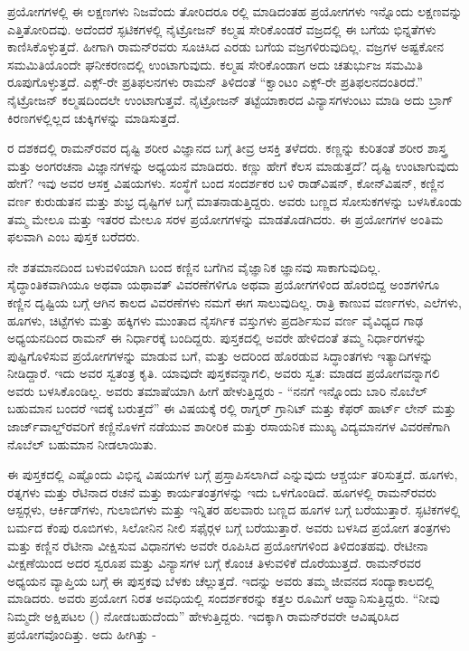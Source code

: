 ಪ್ರಯೋಗಗಳಲ್ಲಿ ಈ ಲಕ್ಷಣಗಳು ನಿಜವೆಂದು ತೋರಿದರೂ ರಲ್ಲಿ ಮಾಡಿದಂತಹ ಪ್ರಯೋಗಗಳು ಇನ್ನೊಂದು ಲಕ್ಷಣವನ್ನು ಎತ್ತಿತೋರಿದವು. ಅದೆಂದರೆ ಸ್ಫಟಿಕಗಳಲ್ಲಿ ನೈಟ್ರೋಜನ್ ಕಲ್ಮಷ ಸೇರಿಕೊಂಡರೆ ವಜ್ರದಲ್ಲಿ ಈ ಬಗೆಯ ಭಿನ್ನತೆಗಳು ಕಾಣಿಸಿಕೊಳ್ಳುತ್ತದೆ. ಹೀಗಾಗಿ ರಾಮನ್‍ರವರು ಸೂಚಿಸಿದ ಎರಡು ಬಗೆಯ ವಜ್ರಗಳಿರುವುದಿಲ್ಲ. ವಜ್ರಗಳ ಅಷ್ಟಕೋನ ಸಮಮಿತಿಯೊಂದೇ ಘನೀಕರಣದಲ್ಲಿ ಉಂಟಾಗುವುದು. ಕಲ್ಮಷ ಸೇರಿಕೊಂಡಾಗ ಅದು ಚತುರ್ಭುಜ ಸಮಮಿತಿ ರೂಪುಗೊಳ್ಳುತ್ತದೆ. ಎಕ್ಸ್-ರೇ ಪ್ರತಿಫಲನಗಳು ರಾಮನ್ ತಿಳಿದಂತೆ “ಕ್ವಾಂಟಂ ಎಕ್ಸ್-ರೇ ಪ್ರತಿಫಲನದಂತಿರದೆ.” ನೈಟ್ರೋಜನ್ ಕಲ್ಮಷದಿಂದಲೇ ಉಂಟಾಗುತ್ತವೆ. ನೈಟ್ರೋಜನ್ ತಟ್ಟೆಯಾಕಾರದ ವಿನ್ಯಾಸಗಳುಂಟು ಮಾಡಿ ಅದು ಬ್ರಾಗ್ ಕಿರಣಗಳಲ್ಲಿಲ್ಲದ ಚುಕ್ಕಿಗಳನ್ನು ಮಾಡಿಸುತ್ತದೆ.



ರ ದಶಕದಲ್ಲಿ ರಾಮನ್‍ರವರ ದೃಷ್ಟಿ ಶರೀರ ವಿಜ್ಞಾನದ ಬಗ್ಗೆ ತೀವ್ರ ಆಸಕ್ತಿ ತಳೆದರು. ಕಣ್ಣನ್ನು ಕುರಿತಂತೆ ಶರೀರ ಶಾಸ್ತ್ರ ಮತ್ತು ಅಂಗರಚನಾ ವಿಜ್ಞಾನಗಳನ್ನು ಅಧ್ಯಯನ ಮಾಡಿದರು. ಕಣ್ಣು ಹೇಗೆ ಕೆಲಸ ಮಾಡುತ್ತದೆ? ದೃಷ್ಟಿ ಉಂಟಾಗುವುದು ಹೇಗೆ? ಇವು ಅವರ ಆಸಕ್ತ ವಿಷಯಗಳು. ಸಂಸ್ಥೆಗೆ ಬಂದ ಸಂದರ್ಶಕರ ಬಳಿ ರಾಡ್‍ವಿಷನ್, ಕೋನ್‍ವಿಷನ್, ಕಣ್ಣಿನ ವರ್ಣ ಕುರುಡುತನ ಮತ್ತು ಶುಭ್ರ ದೃಷ್ಟಿಗಳ ಬಗ್ಗೆ ಮಾತನಾಡುತ್ತಿದ್ದರು. ಅವರು ಬಣ್ಣದ ಸೋಸುಕಗಳನ್ನು ಬಳಸಿಕೊಂಡು ತಮ್ಮ ಮೇಲೂ ಮತ್ತು ಇತರರ ಮೇಲೂ ಸರಳ ಪ್ರಯೋಗಗಳನ್ನು ಮಾಡತೊಡಗಿದರು. ಈ ಪ್ರಯೋಗಗಳ ಅಂತಿಮ ಫಲವಾಗಿ \textit{} ಎಂಬ ಪುಸ್ತಕ ಬರೆದರು.

ನೇ ಶತಮಾನದಿಂದ ಬಳುವಳಿಯಾಗಿ ಬಂದ ಕಣ್ಣಿನ ಬಗೆಗಿನ ವೈಜ್ಞಾನಿಕ ಜ್ಞಾನವು ಸಾಕಾಗುವುದಿಲ್ಲ. ಸೈದ್ಧಾಂತಿಕವಾಗಿಯೂ ಅಥವಾ ಯಥಾವತ್ ವಿವರಣೆಗಳಿಗೂ ಅಥವಾ ಪ್ರಯೋಗಗಳಿಂದ ಹೊರಬಿದ್ದ ಅಂಶಗಳಿಗೂ ಕಣ್ಣಿನ ದೃಷ್ಟಿಯ ಬಗ್ಗೆ ಆಗಿನ ಕಾಲದ ವಿವರಣೆಗಳು ನಮಗೆ ಈಗ ಸಾಲುವುದಿಲ್ಲ. ರಾತ್ರಿ ಕಾಣುವ ವರ್ಣಗಳು, ಎಲೆಗಳು, ಹೂಗಳು, ಚಿಟ್ಟೆಗಳು ಮತ್ತು ಹಕ್ಕಿಗಳು ಮುಂತಾದ ನೈಸರ್ಗಿಕ ವಸ್ತುಗಳು ಪ್ರದರ್ಶಿಸುವ ವರ್ಣ ವೈವಿಧ್ಯದ ಗಾಢ ಅಧ್ಯಯನದಿಂದ ರಾಮನ್ ಈ ನಿರ್ಧಾರಕ್ಕೆ ಬಂದಿದ್ದರು. ಪುಸ್ತಕದಲ್ಲಿ ಅವರೇ ಹೇಳಿದಂತೆ ತಮ್ಮ ನಿರ್ಧಾರಗಳನ್ನು ಪುಷ್ಟಿಗೊಳಿಸುವ ಪ್ರಯೋಗಗಳನ್ನು ಮಾಡುವ ಬಗೆ, ಮತ್ತು ಅದರಿಂದ ಹೊರಡುವ ಸಿದ್ಧಾಂತಗಳು ಇತ್ಯಾದಿಗಳನ್ನು ನೀಡಿದ್ದಾರೆ. ಇದು ಅವರ ಸ್ವತಂತ್ರ ಕೃತಿ. ಯಾವುದೇ ಪುಸ್ತಕವನ್ನಾಗಲಿ, ಅವರು ಸ್ವತ: ಮಾಡದ ಪ್ರಯೋಗವನ್ನಾಗಲಿ ಅವರು ಬಳಸಿಕೊಂಡಿಲ್ಲ. ಅವರು ತಮಾಷೆಯಾಗಿ ಹೀಗೆ ಹೇಳುತ್ತಿದ್ದರು - “ನನಗೆ ಇನ್ನೊಂದು ಬಾರಿ ನೊಬೆಲ್ ಬಹುಮಾನ ಬಂದರೆ ಇದಕ್ಕೆ ಬರುತ್ತದೆ” ಈ ವಿಷಯಕ್ಕೆ ರಲ್ಲಿ ರಾಗ್ನರ್ ಗ್ರಾನಿಟ್ ಮತ್ತು ಕೆಫರ್ ಹಾರ್ಟ್ ಲೇನ್ ಮತ್ತು ಜಾರ್ಜ್‌ವಾಲ್ಡ್‌ರವರಿಗೆ ಕಣ್ಣಿನೊಳಗೆ ನಡೆಯುವ ಶಾರೀರಿಕ ಮತ್ತು ರಸಾಯನಿಕ ಮುಖ್ಯ ವಿದ್ಯಮಾನಗಳ ವಿವರಣೆಗಾಗಿ ನೊಬೆಲ್ ಬಹುಮಾನ ನೀಡಲಾಯಿತು.

ಈ ಪುಸ್ತಕದಲ್ಲಿ ಎಷ್ಟೊಂದು ವಿಭಿನ್ನ ವಿಷಯಗಳ ಬಗ್ಗೆ ಪ್ರಸ್ತಾಪಿಸಲಾಗಿದೆ ಎನ್ನುವುದು ಆಶ್ಚರ್ಯ ತರಿಸುತ್ತದೆ. ಹೂಗಳು, ರತ್ನಗಳು ಮತ್ತು ರೆಟಿನಾದ ರಚನೆ ಮತ್ತು ಕಾರ್ಯತಂತ್ರಗಳನ್ನು ಇದು ಒಳಗೊಂಡಿದೆ. ಹೂಗಳಲ್ಲಿ ರಾಮನ್‍ರವರು ಆಸ್ಟರ್‍ಗಳು, ಆರ್ಕಿಡ್‍ಗಳು, ಗುಲಾಬಿಗಳು ಮತ್ತು ಇನ್ನಿತರ ಹಲವಾರು ಬಣ್ಣದ ಹೂಗಳ ಬಗ್ಗೆ ಬರೆಯುತ್ತಾರೆ. ಸ್ಫಟಿಕಗಳಲ್ಲಿ ಬರ್ಮದ ಕೆಂಪು ರೂಬಿಗಳು, ಸಿಲೋನಿನ ನೀಲಿ ಸಫೈರ್‍ಗಳ ಬಗ್ಗೆ ಬರೆಯುತ್ತಾರೆ. ಅವರು ಬಳಸಿದ ಪ್ರಯೋಗ ತಂತ್ರಗಳು ಮತ್ತು ಕಣ್ಣಿನ ರೆಟೀನಾ ವೀಕ್ಷಿಸುವ ವಿಧಾನಗಳು ಅವರೇ ರೂಪಿಸಿದ ಪ್ರಯೋಗಗಳಿಂದ ತಿಳಿದಂತಹವು. ರೇಟೀನಾ ವೀಕ್ಷಣೆಯಿಂದ ಅದರ ಸ್ವರೂಪ ಮತ್ತು ವಿನ್ಯಾಸಗಳ ಬಗ್ಗೆ ಕೊಂಚ ತಿಳುವಳಿಕೆ ದೊರೆಯುತ್ತದೆ. ರಾಮನ್‍ರವರ ಅಧ್ಯಯನ ವ್ಯಾಪ್ತಿಯ ಬಗ್ಗೆ ಈ ಪುಸ್ತಕವು ಬೆಳಕು ಚೆಲ್ಲುತ್ತದೆ. ಇದನ್ನು ಅವರು ತಮ್ಮ ಜೀವನದ ಸಂದ್ಯಾಕಾಲದಲ್ಲಿ ಮಾಡಿದರು. ಅವರು ಪ್ರಯೋಗ ನಿರತ ಅವಧಿಯಲ್ಲಿ ಸಂದರ್ಶಕರನ್ನು ಕತ್ತಲ ರೂಮಿಗೆ ಆಹ್ವಾನಿಸುತ್ತಿದ್ದರು. “ನೀವು ನಿಮ್ಮದೇ ಅಕ್ಷಿಪಟಲ () ನೋಡಬಹುದೆಂದು” ಹೇಳುತ್ತಿದ್ದರು. ಇದಕ್ಕಾಗಿ ರಾಮನ್‍ರವರೇ ಆವಿಷ್ಕರಿಸಿದ ಪ್ರಯೋಗವೊಂದಿತ್ತು. ಅದು ಹೀಗಿತ್ತು -

